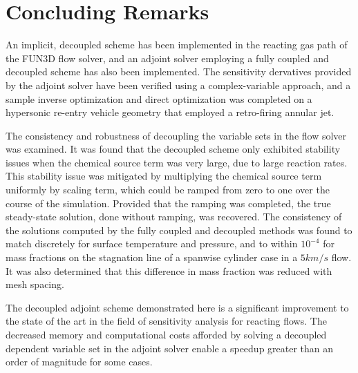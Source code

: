 \chapter{Concluding Remarks}
\label{chapter-ten}

An implicit, decoupled scheme has been implemented in the reacting gas path of
the FUN3D flow solver, and an adjoint solver employing a fully coupled and
decoupled scheme has also been implemented.  The sensitivity dervatives provided
by the adjoint solver have been verified using a complex-variable approach, and
a sample inverse optimization and direct optimization was completed on a
hypersonic re-entry vehicle geometry that employed a retro-firing annular jet.

The consistency and robustness of decoupling the variable sets in the flow
solver was examined.  It was found that the decoupled scheme only exhibited
stability issues when the chemical source term was very large, due to large
reaction rates.  This stability issue was mitigated by multiplying the chemical
source term uniformly by scaling term, which could be ramped from zero to one
over the course of the simulation.  Provided that the ramping was completed, the
true steady-state solution, done without ramping, was recovered.  The
consistency of the solutions computed by the fully coupled and decoupled methods
was found to match discretely for surface temperature and pressure, and to
within $10^{-4}$ for mass fractions on the stagnation line of a spanwise
cylinder case in a $5 km/s$ flow.  It was also determined that this difference
in mass fraction was reduced with mesh spacing.

The decoupled adjoint scheme demonstrated here is a significant improvement to
the state of the art in the field of sensitivity analysis for reacting flows.
The decreased memory and computational costs afforded by solving a decoupled
dependent variable set in the adjoint solver enable a speedup greater than an
order of magnitude for some cases.  
